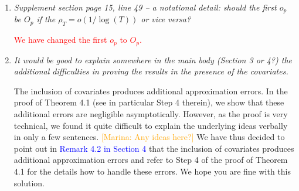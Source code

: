 \documentclass[a4paper,12pt]{article}
\begin{document}
\begin{enumerate}[label=\arabic*.,leftmargin=0.6cm]



\item \textit{Supplement section page 15, line 49 -- a notational detail: should the first $o_p$ be $O_p$ if the $\rho_T = o(1/ \log(T))$ or vice versa?}  

\textcolor{red}{We have changed the first $o_p$ to $O_p$.} 


\item \textit{It would be good to explain somewhere in the main body (Section 3 or 4?) the additional difficulties in proving the results in the presence of the covariates.}
  
The inclusion of covariates produces additional approximation errors. In the proof of Theorem 4.1 (see in particular Step 4 therein), we show that these additional errors are negligible asymptotically. However, as the proof is very technical, we found it quite difficult to explain the underlying ideas verbally in only a few sentences. \textcolor{orange}{[Marina: Any ideas here?]} We have thus decided to point out in \textcolor{blue}{Remark 4.2 in Section 4} that the inclusion of covariates produces additional approximation errors and refer to Step 4 of the proof of Theorem 4.1 for the details how to handle these errors. We hope you are fine with this solution.  
  
\end{enumerate}
\end{document}
